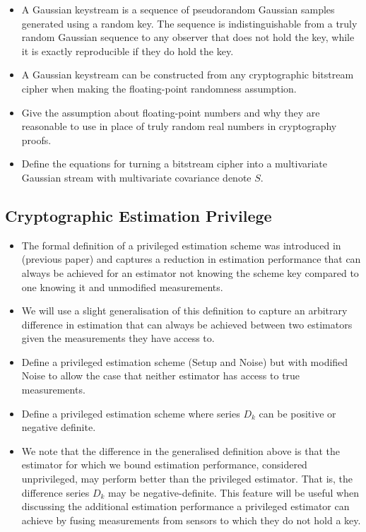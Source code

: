 \documentclass[conference]{IEEEtran}
\begin{document}
\begin{itemize}
  \item A Gaussian keystream is a sequence of pseudorandom Gaussian samples generated using a random key. The sequence is indistinguishable from a truly random Gaussian sequence to any observer that does not hold the key, while it is exactly reproducible if they do hold the key.
  \item A Gaussian keystream can be constructed from any cryptographic bitstream cipher when making the floating-point randomness assumption.
  \item Give the assumption about floating-point numbers and why they are reasonable to use in place of truly random real numbers in cryptography proofs.
  \item Define the equations for turning a bitstream cipher into a multivariate Gaussian stream with multivariate covariance denote $S$.
\end{itemize}

% 
% 

\subsection{Cryptographic Estimation Privilege}\label{subsec:crypto_privilege}
\begin{itemize}
  \item The formal definition of a privileged estimation scheme was introduced in (previous paper) and captures a reduction in estimation performance that can always be achieved for an estimator not knowing the scheme key compared to one knowing it and unmodified measurements.
  \item We will use a slight generalisation of this definition to capture an arbitrary difference in estimation that can always be achieved between two estimators given the measurements they have access to.
  \item Define a privileged estimation scheme (Setup and Noise) but with modified Noise to allow the case that neither estimator has access to true measurements.
  \item Define a privileged estimation scheme where series $D_k$ can be positive or negative definite.
  \item We note that the difference in the generalised definition above is that the estimator for which we bound estimation performance, considered unprivileged, may perform better than the privileged estimator. That is, the difference series $D_k$ may be negative-definite. This feature will be useful when discussing the additional estimation performance a privileged estimator can achieve by fusing measurements from sensors to which they do not hold a key.
\end{itemize}
\end{document}
